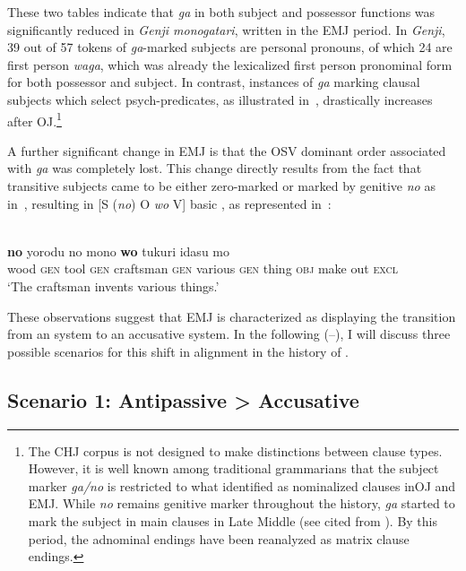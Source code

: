 \documentclass[output=paper]{LSP/langsci}
\begin{document}
These two tables indicate that \textit{ga} in both subject and possessor functions was significantly reduced in \textit{Genji monogatari}, written in the EMJ period. In \textit{Genji}, 39 out of 57 tokens of \textit{ga}-marked subjects are personal pronouns, of which 24 are first person \textit{waga}, which was already the lexicalized first person pronominal form for both possessor and subject. In contrast, instances of \textit{ga} marking clausal subjects which select psych-predicates, as illustrated in~, drastically increases after OJ.\footnote{The CHJ corpus is not designed to make distinctions between clause types. However, it is well known among traditional  grammarians that the subject marker \textit{ga/no} is restricted to what \citet{Yanagidaetal2009Word} identified as nominalized clauses inOJ  and EMJ. While \textit{no} remains genitive marker throughout the history, \textit{ga} started to mark the subject in main clauses in Late Middle  (see  cited from \citealt{Yamada2000Expansion}). By this period, the adnominal endings have been reanalyzed as matrix clause endings.} 

A further significant change in EMJ is that the OSV dominant order associated with \textit{ga} was completely lost. This change directly results from the fact that transitive subjects came to be either zero-marked or marked by genitive \textit{no} as in~, resulting in [S (\textit{no}) O \textit{wo} V] basic , as represented in~:

\begin{exe}
\ex%
\label{14-ya-ex:24}
\\
 \textbf{no} yorodu no mono \textbf{wo} tukuri idasu mo\\
wood \textsc{gen} tool \textsc{gen} craftsman \textsc{gen} various \textsc{gen} thing \textsc{obj} make out \textsc{excl}\\
\glt ‘The craftsman invents various things.’ 
\end{exe}

These observations suggest that EMJ is characterized as displaying the transition from an  system to an accusative system. In the following (--), I will discuss three possible scenarios for this shift in alignment in the history of .

\subsection{Scenario 1: Antipassive > Accusative}
\label{14-ya-sec:4.1}
\end{document}
